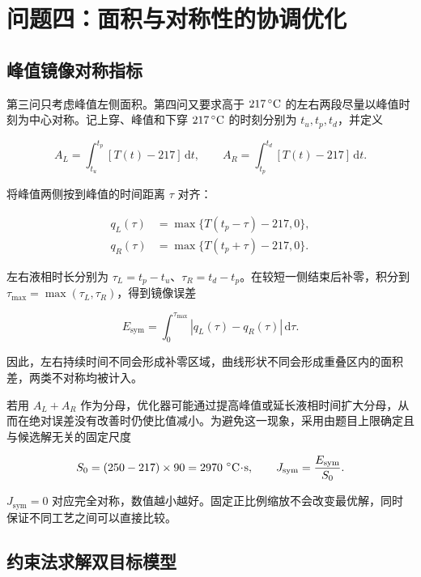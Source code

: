 \section{问题四：面积与对称性的协调优化}

\subsection{峰值镜像对称指标}

第三问只考虑峰值左侧面积。第四问又要求高于 $217\,^{\circ}\mathrm{C}$ 的左右两段尽量以峰值时刻为中心对称。记上穿、峰值和下穿 $217\,^{\circ}\mathrm{C}$ 的时刻分别为 $t_u,t_p,t_d$，并定义

\begin{equation}
  A_L=\int_{t_u}^{t_p}[T(t)-217]\,\mathrm dt,
  \qquad
  A_R=\int_{t_p}^{t_d}[T(t)-217]\,\mathrm dt.
\end{equation}

将峰值两侧按到峰值的时间距离 $\tau$ 对齐：

\begin{equation}
\begin{aligned}
  q_L(\tau)&=\max\{T(t_p-\tau)-217,0\},\\
  q_R(\tau)&=\max\{T(t_p+\tau)-217,0\}.
\end{aligned}
\end{equation}

左右液相时长分别为 $\tau_L=t_p-t_u$、$\tau_R=t_d-t_p$。在较短一侧结束后补零，积分到 $\tau_{\max}=\max(\tau_L,\tau_R)$，得到镜像误差

\begin{equation}
  E_{\mathrm{sym}}=\int_0^{\tau_{\max}}
  |q_L(\tau)-q_R(\tau)|\,\mathrm d\tau.
  \label{eq:esym}
\end{equation}

因此，左右持续时间不同会形成补零区域，曲线形状不同会形成重叠区内的面积差，两类不对称均被计入。

若用 $A_L+A_R$ 作为分母，优化器可能通过提高峰值或延长液相时间扩大分母，从而在绝对误差没有改善时仍使比值减小。为避免这一现象，采用由题目上限确定且与候选解无关的固定尺度

\begin{equation}
  S_0=(250-217)\times90=2970\ \dC\!\cdot\!\mathrm s,
  \qquad
  J_{\mathrm{sym}}=\frac{E_{\mathrm{sym}}}{S_0}.
  \label{eq:jsym}
\end{equation}

$J_{\mathrm{sym}}=0$ 对应完全对称，数值越小越好。固定正比例缩放不会改变最优解，同时保证不同工艺之间可以直接比较。

\subsection{约束法求解双目标模型}

